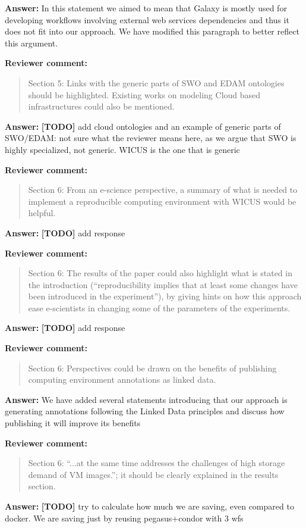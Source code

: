 \documentclass{letter}
\newenvironment{review}%
{\textbf{Reviewer comment:}\begin{quote}}%
{\end{quote}}%
\newcommand{\todo}[1]{%
      \color{red}\textbf{[TODO]} #1\color{black}}
\newcommand{\answer}[1]{%
      \textbf{Answer:} #1}
\begin{document}
\begin{letter}{}
\answer{In this statement we aimed to mean that Galaxy is mostly used for developing workflows involving external web services dependencies and thus it does not fit into our approach. We have modified this paragraph to better reflect this argument.}


\begin{review}
Section 5: Links with the generic parts of SWO and EDAM ontologies should be highlighted. Existing works on modeling Cloud based infrastructures could also be mentioned.
\end{review}

\answer{\todo{add cloud ontologies and an example of generic parts of SWO/EDAM: not sure what the reviewer means here, as we argue that SWO is highly specialized, not generic. WICUS is the one that is generic}}


\begin{review}
Section 6: From an e-science perspective, a summary of what is needed to implement a reproducible computing environment with WICUS would be helpful.
\end{review}

\answer{\todo{add response}}


\begin{review}
Section 6: The results of the paper could also highlight what is stated in the introduction (``reproducibility implies that at least some changes have been introduced in the experiment''), by giving hints on how this approach ease e-scientists in changing some of the parameters of the experiments.
\end{review}

\answer{\todo{add response}}


\begin{review}
Section 6: Perspectives could be drawn on the benefits of publishing computing environment annotations as linked data.
\end{review}

\answer{We have added several statements introducing that our approach is generating annotations following the Linked Data principles and discuss how publishing it will improve its benefits}

\begin{review}
Section 6: ``...at the same time addresses the challenges of high storage demand of VM images.''; it should be clearly explained in the results section.
\end{review}

\answer{\todo{try to calculate how much we are saving, even compared to docker. We are saving just by reusing pegasus+condor with 3 wfs}}



\end{letter}
\end{document}
